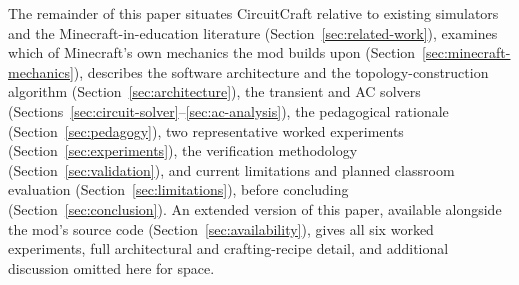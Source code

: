 The remainder of this paper situates CircuitCraft relative to existing simulators and the
Minecraft-in-education literature (Section~\ref{sec:related-work}), examines which of
Minecraft's own mechanics the mod builds upon (Section~\ref{sec:minecraft-mechanics}),
describes the software architecture and the topology-construction algorithm
(Section~\ref{sec:architecture}), the transient and AC solvers
(Sections~\ref{sec:circuit-solver}--\ref{sec:ac-analysis}), the pedagogical rationale
(Section~\ref{sec:pedagogy}), two representative worked experiments
(Section~\ref{sec:experiments}), the verification methodology
(Section~\ref{sec:validation}), and current limitations and planned classroom evaluation
(Section~\ref{sec:limitations}), before concluding (Section~\ref{sec:conclusion}). An
extended version of this paper, available alongside the mod's source code
(Section~\ref{sec:availability}), gives all six worked experiments, full architectural and
crafting-recipe detail, and additional discussion omitted here for space.

